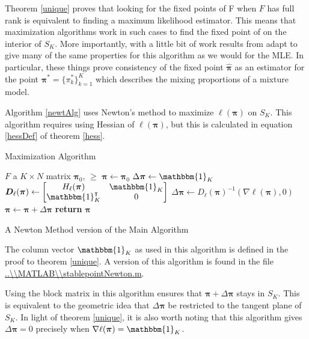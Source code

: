 \label{respMLE}

Theorem \ref{unique} proves that looking for the fixed points of \Rpi F when $F$ has full rank is equivalent to finding a maximum likelihood estimator. This means that maximization algorithms work in such cases to find the fixed point of  on the interior of $S_K$.  More importantly, with a little bit of work results from \citep{WaldMLE, pollard1981, pollard1982} adapt to give many of the same properties for this algorithm as we would for the MLE.  In particular, these things prove consistency of the fixed point $\hat{\bm\pi}$ as an estimator for the point $\bm\pi^\ast=\{\pi_k^\ast\}_{k=1}^{K}$ which describes the mixing proportions of a mixture model.

Algorithm \ref{newtAlg} uses Newton's method to maximize $\ell(\bm\pi)$ on $S_K$. This algorithm requires using Hessian of $\ell(\bm\pi)$, but this is calculated in equation \ref{hessDef} of theorem \ref{hess}.

\begin{table}[h]
\begin{algorithm}[H]
\caption{Maximization Algorithm}\label{newtAlg}
\begin{algorithmic}
\Require $F$ a $K\times N$ matrix
\Require $\bm\pi_0$, $\ge$
	\State $\bm\pi \gets \bm\pi_0$
	\State $\Delta\bm\pi \gets \mathbbm{1}_K$
	\While{$\lVert\Delta\bm\pi\rVert>\ge\lVert\bm\pi\rVert$}
		\State $\bm D_{\ell}(\bm\pi) \gets \Matrix{H_{\ell}(\bm\pi)&\mathbbm{1}_K\\ \mathbbm{1}_K^{\intercal}& 0 }$
		\State $\Delta\bm\pi \gets D_{\ell}(\bm\pi)^{-1}(\nabla\ell(\bm\pi),0)$
		\State $\bm\pi \gets \bm\pi + \Delta\bm\pi$
	\EndWhile
	\State \textbf{return} $\bm\pi$ 
\EndProcedure
\end{algorithmic}
\end{algorithm}
\caption{A Newton Method version of the Main Algorithm}
\end{table}
The column vector $\mathbbm{1}_K$ as used in this algorithm is defined in the proof to theorem \ref{unique}.  A version of this algorithm is found in the file \url{..\\MATLAB\\stablepointNewton.m}.

Using the block matrix in this algorithm ensures that $\bm\pi+\Delta\bm\pi$ stays in $S_K$.  This is equivalent to the geometric idea that $\Delta\bm\pi$ be restricted to the tangent plane of $S_K$.  In light of theorem \ref{unique}, it is also worth noting that this algorithm gives $\Delta\bm\pi=0$ precisely when $\nabla\ell(\bm\pi)=\mathbbm{1}_K$.

